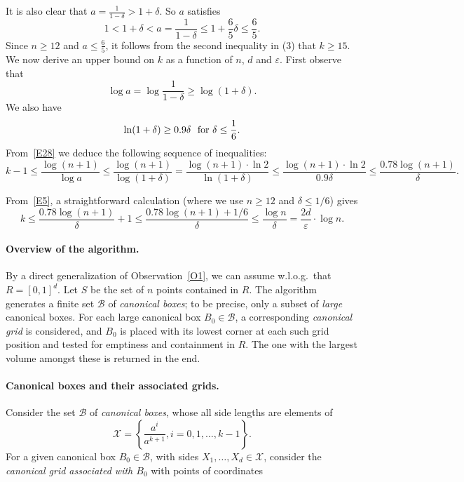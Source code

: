 \documentclass[11pt]{article}
\newcommand{\eps}{\varepsilon}
\def\B{\mathcal B}
\def\X{\mathcal X}
\begin{document}
It is also clear that $a =\frac{1}{1-\delta} > 1+ \delta$.
So $a$ satisfies
\begin{equation} \label{E13}
1 < 1+ \delta <
a =\frac{1}{1-\delta} \leq 1+ \frac{6}{5} \delta \leq \frac{6}{5}. 
\end{equation} 
Since $n \geq 12$ and $a \leq \frac{6}{5}$, it follows from the
second inequality in (3) that $k \geq 15$. 
We now derive an upper bound on $k$ as a function of $n$, $d$ and
$\eps$. First observe that 
$$ \log{a} =\log{\frac{1}{1-\delta} } \geq \log(1+\delta). $$
We also have 
$$ \ln(1+\delta) \geq 0.9 \delta {\rm \ \ for \ }
\delta \leq \frac{1}{6}. $$
From~\eqref{E28} we deduce the following sequence of inequalities: 
\begin{equation} \label{E5}
 k -1 \leq \frac{\log(n+1)}{\log{a}} \leq 
\frac{\log(n+1)}{\log(1+\delta)} =
\frac{\log(n+1)\cdot \ln{2}}{\ln(1+\delta)} \leq 
\frac{\log(n+1)\cdot \ln{2}}{0.9 \delta} \leq
\frac{0.78 \log(n+1)}{\delta}.
\end{equation} 


From~\eqref{E5}, a straightforward calculation 
(where we use $n \geq 12$ and $\delta \leq 1/6$) gives
\begin{equation} \label{E20}
k \leq \frac{0.78 \log(n+1)}{\delta} +1 \leq 
\frac{0.78 \log(n+1) + 1/6}{\delta}  \leq 
\frac{\log{n}}{\delta}= \frac{2d}{\eps} \cdot \log{n}.
\end{equation} 


\paragraph{Overview of the algorithm.}
By a direct generalization of Observation~\ref{O1}, we can assume w.l.o.g.\  
that $R=[0,1]^d$. Let $S$ be the set of $n$ points contained in $R$.
The algorithm generates a finite set $\B$ of {\em canonical boxes};
to be precise, only a subset of {\em large} canonical boxes.
For each large canonical box $B_0 \in \B$, a corresponding {\em
canonical grid} is considered, and $B_0$ is placed with its lowest
corner at each such grid position and tested for emptiness and containment in $R$. 
The one with the largest volume amongst these is returned in the end. 

\paragraph{Canonical boxes and their associated grids.}
Consider the set $\B$ of {\em canonical boxes}, whose 
all side lengths are elements of
\begin{equation} \label{E18}
\X=\left\{\frac{a^i}{a^{k+1}}, i=0,1,\ldots,k-1\right\}. 
\end{equation} 
For a given canonical box $B_0 \in \B$, with sides 
$X_1,\ldots,X_d \in \X$,
consider the {\em canonical grid associated with $B_0$} 
with points of coordinates 
\end{document}
